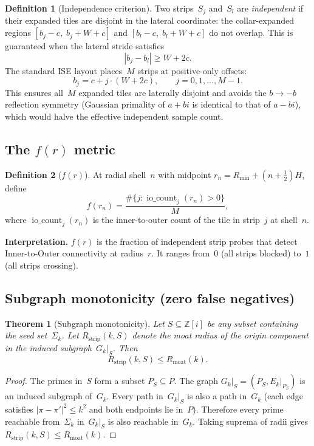 \documentclass[11pt,a4paper]{article}
\newcommand{\Zi}{\mathbb{Z}[i]}
\newcommand{\Gk}{G_k}
\newcommand{\fr}{f(r)}
\newcommand{\Rmoat}{R_{\mathrm{moat}}}
\newcommand{\iocount}{\operatorname{io\_count}}
\theoremstyle{definition}
\newtheorem{definition}{Definition}[section]
\theoremstyle{plain}
\newtheorem{theorem}{Theorem}[section]
\theoremstyle{remark}
\begin{document}
\begin{definition}[Independence criterion]\label{def:independence}
Two strips~$S_j$ and~$S_l$ are \emph{independent} if their expanded tiles are disjoint in the lateral coordinate: the collar-expanded regions $[b_j - c,\; b_j + W + c]$ and $[b_l - c,\; b_l + W + c]$ do not overlap.  This is guaranteed when the lateral stride satisfies
\[
  |b_j - b_l| \ge W + 2c.
\]
The standard ISE layout places~$M$ strips at positive-only offsets:
\[
  b_j = c + j \cdot (W + 2c), \qquad j = 0, 1, \ldots, M-1.
\]
This ensures all~$M$ expanded tiles are laterally disjoint and avoids the $b \to -b$ reflection symmetry (Gaussian primality of $a + bi$ is identical to that of $a - bi$), which would halve the effective independent sample count.
\end{definition}

\subsection{The \texorpdfstring{$\fr$}{f(r)} metric}

\begin{definition}[$\fr$]\label{def:fr}
At radial shell~$n$ with midpoint $r_n = R_{\min} + (n + \tfrac{1}{2})H$, define
\[
  f(r_n) = \frac{\#\{j : \iocount_j(r_n) > 0\}}{M},
\]
where $\iocount_j(r_n)$ is the inner-to-outer count of the tile in strip~$j$ at shell~$n$.
\end{definition}

\noindent\textbf{Interpretation.}  $\fr$ is the fraction of independent strip probes that detect Inner-to-Outer connectivity at radius~$r$.  It ranges from~$0$ (all strips blocked) to~$1$ (all strips crossing).

\subsection{Subgraph monotonicity (zero false negatives)}

\begin{theorem}[Subgraph monotonicity]\label{thm:monotonicity}
Let $S \subseteq \Zi$ be any subset containing the seed set~$\Sigma_k$.  Let $R_{\mathrm{strip}}(k, S)$ denote the moat radius of the origin component in the induced subgraph~$\Gk|_S$.  Then
\[
  R_{\mathrm{strip}}(k, S) \le \Rmoat(k).
\]
\end{theorem}

\begin{proof}
The primes in~$S$ form a subset $P_S \subseteq P$.  The graph $\Gk|_S = (P_S, E_k|_{P_S})$ is an induced subgraph of~$\Gk$.  Every path in~$\Gk|_S$ is also a path in~$\Gk$ (each edge satisfies $|\pi - \pi'|^2 \le k^2$ and both endpoints lie in~$P$).  Therefore every prime reachable from~$\Sigma_k$ in~$\Gk|_S$ is also reachable in~$\Gk$.  Taking suprema of radii gives $R_{\mathrm{strip}}(k, S) \le \Rmoat(k)$.
\end{proof}
\end{document}
